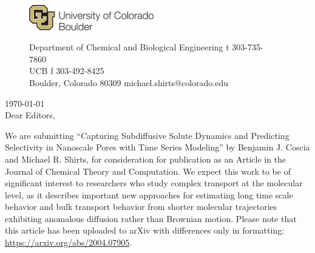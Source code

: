 \documentclass[fontsize=11pt]{article}
\begin{document}
	\graphicspath{{./figures/}}

	\begin{figure}
	\centering
	\begin{minipage}{0.37\textwidth}
	\includegraphics[width=2.14in,left]{CUBoulder.pdf}
	\end{minipage}
	\begin{minipage}{0.62\textwidth}
	\scriptsize
	\noindent Department of Chemical and Biological Engineering \hfill t 303-735-7860~~~~~~~~~~~~~~~~~~ \\
	 UCB \hfill f 303-492-8425~~~~~~~~~~~~~~~~~~ \\
	\noindent Boulder, Colorado 80309 \hfill michael.shirts@colorado.edu \\
	\end{minipage}
	\end{figure}
	
	\noindent \today \\

	\noindent Dear Editors,\\
	
	\newcommand{\ManuscriptTitle}{Capturing Subdiffusive Solute Dynamics and 
	Predicting Selectivity in Nanoscale Pores with Time Series Modeling}
	
	We are submitting ``\ManuscriptTitle'' by Benjamin J. Coscia and Michael 
	R.  Shirts, for consideration for publication as an Article in the Journal
	of Chemical Theory and Computation. We expect this work to be of significant
	interest to researchers who study complex transport at the molecular level,
	as it describes important new approaches for estimating long time scale 
	behavior and bulk transport behavior from shorter molecular trajectories 
	exhibiting anomalous diffusion rather than Brownian motion. Please note 
	that this article has been uploaded to arXiv with differences only in 
	formatting: \href{https://arxiv.org/abs/2004.07905}{https://arxiv.org/abs/2004.07905}. \\        
	
\end{document}
